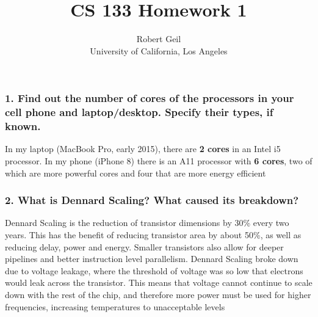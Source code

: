 \documentclass[titlepage]{article}
\title{CS 133 Homework 1}
\author{Robert Geil \\ University of California, Los Angeles}
\begin{document}
\maketitle
\subsubsection*{1. Find out the number of cores of the processors in your cell phone and laptop/desktop.
Specify their types, if known.}
In my laptop (MacBook Pro, early 2015), there are \textbf{2 cores} in an Intel i5 processor. In my phone
(iPhone 8) there is an A11 processor with \textbf{6 cores}, two of which are more powerful cores and four
that are more energy efficient

\subsubsection*{2. What is Dennard Scaling? What caused its breakdown?}
Dennard Scaling is the reduction of transistor dimensions by 30\% every two years. This has the benefit of
reducing transistor area by about 50\%, as well as reducing delay, power and energy. Smaller transistors
also allow for deeper pipelines and better instruction level parallelism. Dennard Scaling broke down due
to voltage leakage, where the threshold of voltage was so low that electrons would leak across the transistor.
This means that voltage cannot continue to scale down with the rest of the chip, and therefore more power
must be used for higher frequencies, increasing temperatures to unacceptable levels
\end{document}

